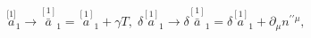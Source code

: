 \begin{equation}
\stackrel{\lbrack 1]}{a}_{1}\rightarrow \stackrel{[1]}{\bar{a}}_{1}=%
\stackrel{[1]}{a}_{1}+\gamma T,\;\delta \stackrel{[1]}{a}_{1}\rightarrow
\delta \stackrel{[1]}{\bar{a}}_{1}=\delta \stackrel{[1]}{a}_{1}+\partial
_{\mu }n^{\prime \prime \mu },  \label{bf78f}
\end{equation}

